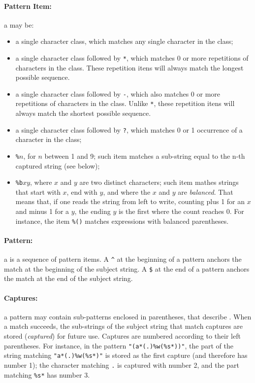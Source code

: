 \paragraph{Pattern Item:}
a  may be:
\begin{itemize}
\item
a single character class,
which matches any single character in the class;
\item
a single character class followed by \verb'*',
which matches 0 or more repetitions of characters in the class.
These repetition itens will always match the longest possible sequence.
\item
a single character class followed by \verb'-',
which also matches 0 or more repetitions of characters in the class.
Unlike \verb'*',
these repetition itens will always match the shortest possible sequence.
\item
a single character class followed by \verb'?',
which matches 0 or 1 occurrence of a character in the class;
\item
{\tt \%$n$}, for $n$ between 1 and 9;
such item matches a sub-string equal to the n-th captured string
(see below);
\item
{\tt \%b$xy$}, where $x$ and $y$ are two distinct characters;
such item mathes strings that start with $x$, end with $y$, 
and where the $x$ and $y$ are {\em balanced}.
That means that, if one reads the string from left to write,
counting plus 1 for an $x$ and minus 1 for a $y$,
the ending $y$ is the first where the count reaches 0.
For instance, the item \verb|%()| matches expressions with
balanced parentheses.
\end{itemize}

\paragraph{Pattern:}
a  is a sequence of pattern items.
A \verb'^' at the beginning of a pattern anchors the match at the
beginning of the subject string.
A \verb'$' at the end of a pattern anchors the match at the
end of the subject string.

\paragraph{Captures:}
a pattern may contain sub-patterns enclosed in parentheses,
that describe .
When a match succeeds, the sub-strings of the subject string
that match captures are stored ({\em captured\/}) for future use.
Captures are numbered according to their left parentheses.
For instance, in the pattern \verb|"(a*(.)%w(%s*))"|,
the part of the string matching \verb|"a*(.)%w(%s*)"| is
stored as the first capture (and therefore has number 1);
the character matching \verb|.| is captured with number 2,
and the part matching \verb|%s*| has number 3.

